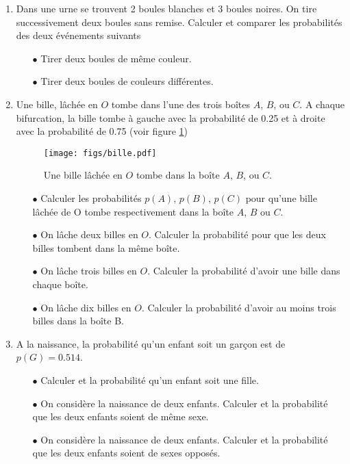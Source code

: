 \documentclass[a4paper,12pt]{book}
\begin{document}
\begin{enumerate}
 \item Dans une urne se trouvent 2 boules blanches et 3 boules noires. On tire successivement deux boules sans remise.
Calculer et comparer les probabilités des deux événements suivants
\begin{itemize}
 \item[$\bullet$] Tirer deux boules de même couleur.
 \item[$\bullet$] Tirer deux boules de couleurs différentes.
\end{itemize}
\item Une bille, lâchée en $O$ tombe dans l'une des trois boîtes $A$, $B$, ou $C$. A chaque bifurcation, la bille 
tombe à gauche avec la probabilité de 0.25 et à droite avec la probabilité de 0.75 (voir figure \ref{fig_bille})
\begin{figure}[htp]
\begin{center}
\texttt{[image: figs/bille.pdf]}
\end{center}
\caption{Une bille lâchée en $O$ tombe dans la boîte $A$, $B$, ou $C$.}\label{fig_bille}
\end{figure}
\begin{itemize}
 \item[$\bullet$] Calculer les probabilités $p(A)$, $p(B)$, $p(C)$ pour qu'une bille lâchée de O tombe respectivement 
dans la boîte $A$, $B$ ou $C$.
\item[$\bullet$] On lâche deux billes en $O$. Calculer la probabilité pour que les deux billes tombent dans la même boîte.
\item[$\bullet$] On lâche trois billes en $O$. Calculer la probabilité d'avoir une bille dans chaque boîte.
\item[$\bullet$] On lâche dix billes en $O$. Calculer la probabilité d'avoir au moins trois billes dans la boîte B.
\end{itemize}
\item A la naissance, la probabilité qu'un enfant soit un garçon
est de $p(G)=0.514$.
\begin{itemize}
 \item[$\bullet$] Calculer et la probabilité qu'un enfant soit une fille.
 \item[$\bullet$] On considère la naissance de deux enfants. Calculer et la probabilité que les deux enfants soient de même sexe.
 \item[$\bullet$] On considère la naissance de deux enfants. Calculer et la probabilité que les deux enfants soient de sexes opposés.
\end{itemize}
\end{enumerate}
\end{document}

